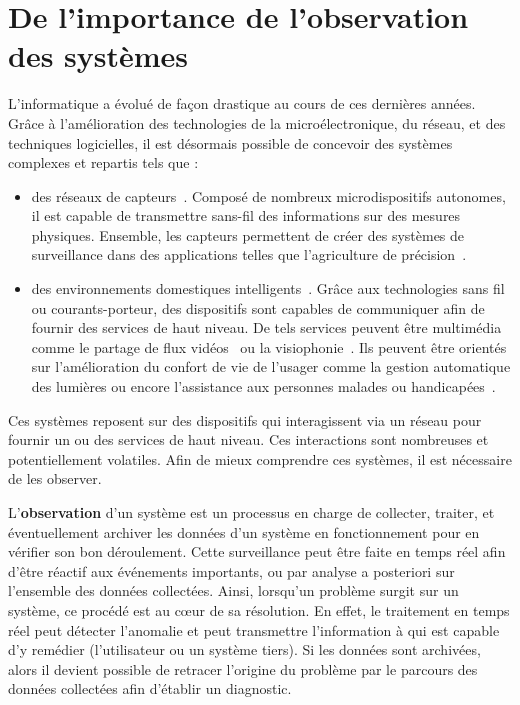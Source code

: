 \section{De l'importance de l'observation des systèmes}\label{sec:intro:contexte}
L'informatique a évolué de façon drastique au cours de ces dernières années. Grâce à l'amélioration des technologies de la microélectronique, du réseau, et des techniques logicielles, il est désormais possible de concevoir des systèmes complexes et repartis tels que :
\begin{itemize}
 \item des réseaux de capteurs~\cite{Akyildiz:wsn,Szewczyk:monitoring}. Composé de nombreux microdispositifs autonomes, il est capable de transmettre sans-fil des informations sur des mesures physiques. Ensemble, les capteurs permettent de créer des systèmes de surveillance dans des applications telles que l'agriculture de précision~\cite{Jurdak:sumac}.
 \item des environnements domestiques intelligents~\cite{Harper:smarthome, Chan:smarthome, Coyle:assisted}. Grâce aux technologies sans fil ou courants-porteur, des dispositifs sont capables de communiquer afin de fournir des services de haut niveau. De tels services peuvent être multimédia comme le partage de flux vidéos~\cite{Kang:upnpav} ou la visiophonie~\cite{Vilei:videophone}. Ils peuvent être orientés sur l'amélioration du confort de vie de l'usager comme la gestion automatique des lumières ou encore l'assistance aux personnes malades ou handicapées~\cite{Korhonen:health}.
\end{itemize}

Ces systèmes reposent sur des dispositifs qui interagissent via un réseau pour fournir un ou des services de haut niveau. Ces interactions sont nombreuses et potentiellement volatiles. Afin de mieux comprendre ces systèmes, il est nécessaire de les observer.

L'\textbf{observation} d'un système est un processus en charge de collecter, traiter, et éventuellement archiver les données d'un système en fonctionnement pour en vérifier son bon déroulement. Cette surveillance peut être faite en temps réel afin d'être réactif aux événements importants, ou par analyse a posteriori sur l'ensemble des données collectées. Ainsi, lorsqu'un problème surgit sur un système, ce procédé est au cœur de sa résolution. En effet, le traitement en temps réel peut détecter l'anomalie et peut transmettre l'information à qui est capable d'y remédier (l'utilisateur ou un système tiers). Si les données sont archivées, alors il devient possible de retracer l'origine du problème par le parcours des données collectées afin d'établir un diagnostic.

